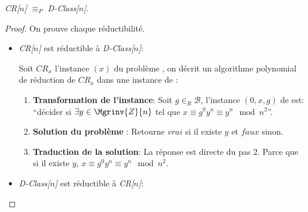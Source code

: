	\begin{theorem} \emph{CR[$n$]} $\equiv_P$ \emph{D-Class[$n$]}.
		\label{theorem:cr}
		\begin{proof}
		On prouve chaque réductibilité.

			\begin{itemize} 
				\item \emph{CR[$n$]} est réductible à \emph{D-Class[$n$]}:
					
				Soit $CR_x$  l'instance $(x)$ du problème , on décrit un algorithme polynomial de réduction de $CR_x$
				dans une instance de :
				\begin{enumerate}
					\item \textbf{Transformation de l'instance}:
						Soit $g \in_R \mathcal{B}$, l'instance $(0,x,g)$ de  est: ``décider si $\exists y \in \Mgrinv{Z}{n}$ 
						tel que $x \equiv g^0y^n \equiv y^n\mod{n^2}$''.
					\item \textbf{Solution du problème }:
						Retourne $vrai$ si il existe $y$ et $faux$ sinon.
					\item \textbf{Traduction de la solution}:
						La réponse est directe du pas 2. Parce que si il existe $y$, $x \equiv g^0y^n\equiv y^n\mod{n^2}$.
				\end{enumerate}
			

				\item \emph{D-Class[$n$]} est réductible à \emph{CR[$n$]}:
					

\end{itemize}
\end{proof}
\end{theorem}
